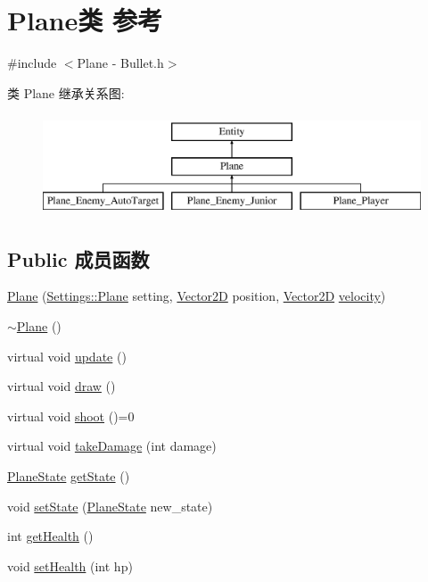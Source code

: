 \hypertarget{class_plane}{}\section{Plane类 参考}
\label{class_plane}


{\ttfamily \#include $<$Plane -\/ Bullet.\+h$>$}

类 Plane 继承关系图\+:\begin{figure}[H]
\begin{center}
\leavevmode
\includegraphics[height=3.000000cm]{class_plane}
\end{center}
\end{figure}
\subsection*{Public 成员函数}
\begin{DoxyCompactItemize}
\item 
\hyperlink{class_plane_ab0729538ddb380ca9a5b501f4cf72714}{Plane} (\hyperlink{struct_settings_1_1_plane}{Settings\+::\+Plane} setting, \hyperlink{_vector2_d_8hpp_aa1f1145650f1dd9bddf7335ec6434d7c}{Vector2D} position, \hyperlink{_vector2_d_8hpp_aa1f1145650f1dd9bddf7335ec6434d7c}{Vector2D} \hyperlink{class_entity_a386d25b56772b8913eb3e5adc636f6e0}{velocity})
\item 
\hyperlink{class_plane_a69abd86051c880dcb44b249ad10c4436}{$\sim$\+Plane} ()
\item 
virtual void \hyperlink{class_plane_a7fbb07f76503fe057772e01f542afc32}{update} ()
\item 
virtual void \hyperlink{class_plane_a8877358878e91929c4c01bad40cbdb78}{draw} ()
\item 
virtual void \hyperlink{class_plane_af999499b5e79309d94004e8d012fe9c4}{shoot} ()=0
\item 
virtual void \hyperlink{class_plane_a1a93dbb00292aaae274c152079f5f6f3}{take\+Damage} (int damage)
\item 
\hyperlink{_plane_01-_01_bullet_8h_a9f852e2715e13ec145d551659d2813bc}{Plane\+State} \hyperlink{class_plane_a4b45bbcd85eb0ad999ab256f44b93fcc}{get\+State} ()
\item 
void \hyperlink{class_plane_a40cb32f3c42f1fc772be20448724d277}{set\+State} (\hyperlink{_plane_01-_01_bullet_8h_a9f852e2715e13ec145d551659d2813bc}{Plane\+State} new\+\_\+state)
\item 
int \hyperlink{class_plane_ad63d1e65ff9ca0d8b0ea1f6d37c55388}{get\+Health} ()
\item 
void \hyperlink{class_plane_a139404454150aac00b0f94b7f7d0d68e}{set\+Health} (int hp)
\end{DoxyCompactItemize}
